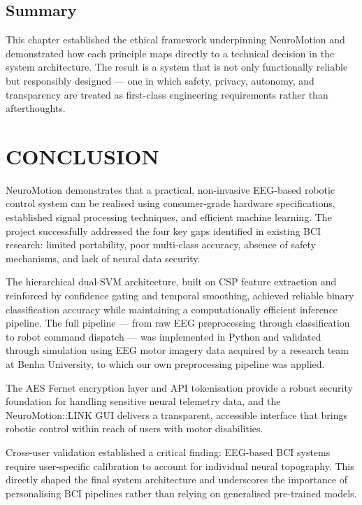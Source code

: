 \documentclass[12pt, a4paper, oneside]{report}
\begin{document}
\begin{description}
\section{Summary}

This chapter established the ethical framework underpinning NeuroMotion and
demonstrated how each principle maps directly to a technical decision in the system
architecture. The result is a system that is not only functionally reliable but
responsibly designed --- one in which safety, privacy, autonomy, and transparency
are treated as first-class engineering requirements rather than afterthoughts.

\chapter*{CONCLUSION}

NeuroMotion demonstrates that a practical, non-invasive EEG-based robotic control
system can be realised using consumer-grade hardware specifications, established signal
processing techniques, and efficient machine learning. The project successfully addressed
the four key gaps identified in existing BCI research: limited portability, poor
multi-class accuracy, absence of safety mechanisms, and lack of neural data security.

The hierarchical dual-SVM architecture, built on CSP feature extraction and reinforced
by confidence gating and temporal smoothing, achieved reliable binary classification
accuracy while maintaining a computationally efficient inference pipeline. The full
pipeline --- from raw EEG preprocessing through classification to robot command
dispatch --- was implemented in Python and validated through simulation using EEG motor
imagery data acquired by a research team at Benha University, to which our own
preprocessing pipeline was applied.

The AES Fernet encryption layer and API tokenisation provide a robust security
foundation for handling sensitive neural telemetry data, and the NeuroMotion::LINK GUI
delivers a transparent, accessible interface that brings robotic control within reach
of users with motor disabilities.

Cross-user validation established a critical finding: EEG-based BCI systems require
user-specific calibration to account for individual neural topography. This directly
shaped the final system architecture and underscores the importance of personalising
BCI pipelines rather than relying on generalised pre-trained models.


\end{description}
\end{document}
